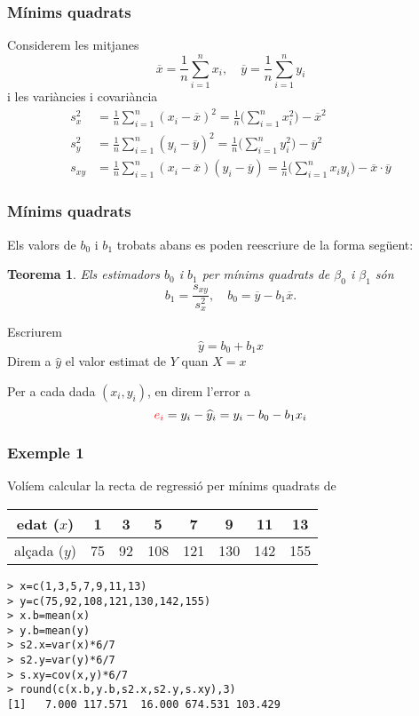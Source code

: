 \documentclass[12pt,t]{beamer}
\newcommand{\red}[1]{\textcolor{red}{#1}}
\renewcommand{\emph}[1]{{\color{red}#1}}
\theoremstyle{plain}
\newtheorem{teorema}{Teorema}
\theoremstyle{definition}
\begin{document}
\begin{frame}
\frametitle{Mínims quadrats}
Considerem les mitjanes
$$
\overline{x}=\frac{1}{n}\sum\limits_{i=1}^n x_i,
\quad \overline{y}=\frac{1}{n} \sum\limits_{i=1}^n y_i
$$
i les variàncies i covariància 
$$
\begin{array}{rl}
s_x^2 &\displaystyle =\frac{1}{n}\sum_{i=1}^n (x_i-\overline{x})^2 =\frac{1}{n}\Big(\sum_{i=1}^n x_i^2\Big) -\overline{x}^2\\[2ex]
s_y^2 &\displaystyle =\frac{1}{n}\sum_{i=1}^n (y_i-\overline{y})^2 =\frac{1}{n}\Big(\sum_{i=1}^n y_i^2\Big) -\overline{y}^2\\[2ex]
s_{xy} &\displaystyle =\frac{1}{n}\sum_{i=1}^n (x_i-\overline{x}) (y_i-\overline{y}) =\frac{1}{n}\Big(\sum_{i=1}^n x_i y_i\Big)-\overline{x}\cdot\overline{y}
\end{array}
$$
\end{frame}

\begin{frame}
\frametitle{Mínims quadrats}
Els valors de $b_0$ i $b_1$ trobats abans es poden reescriure de la forma següent:

\begin{teorema}
Els estimadors $b_0$ i $b_1$ per mínims quadrats de $\beta_0$ i $\beta_1$ són
$$
b_1 =\frac{s_{xy}}{s_x^2},\quad b_0 = \overline{y}-b_1 \overline{x}.
$$
\end{teorema}
Escriurem
$$
\widehat{y}=b_0+b_1x
$$
Direm a $\widehat{y}$ el \emph{valor estimat} de $Y$ quan $X=x$
\medskip

Per a cada dada $(x_i,y_i)$, en direm l'\emph{error} a 
$$
\red{e_i}=y_i-\widehat{y}_i={y}_i-b_0-b_1x_i
$$
\end{frame}

\begin{frame}[fragile]
\frametitle{Exemple 1}
Volíem calcular la recta de regressió per mínims quadrats de
\begin{center}
\begin{tabular}{c|ccccccc}
\hline
edat ($x$) & 1 & 3 & 5 & 7 & 9 & 11 & 13\\
\hline
alçada ($y$) & 75 & 92 & 108 & 121 & 130 & 142 & 155\\
\hline
\end{tabular}
\end{center}
\begin{verbatim}
> x=c(1,3,5,7,9,11,13)
> y=c(75,92,108,121,130,142,155)
> x.b=mean(x)
> y.b=mean(y)
> s2.x=var(x)*6/7
> s2.y=var(y)*6/7
> s.xy=cov(x,y)*6/7
> round(c(x.b,y.b,s2.x,s2.y,s.xy),3)
[1]   7.000 117.571  16.000 674.531 103.429
\end{verbatim}
\end{frame}
\end{document}
